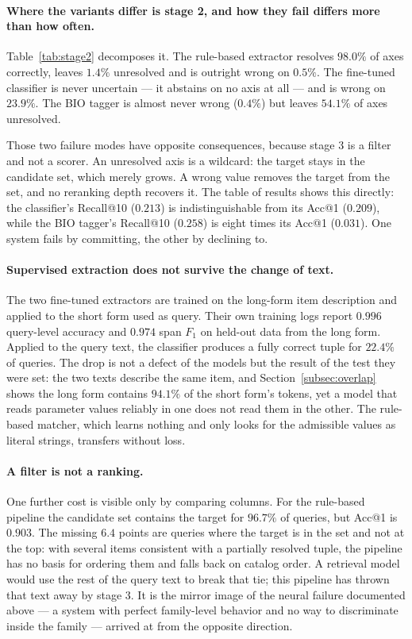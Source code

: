 \documentclass[preprint,review,12pt]{elsarticle}
\begin{document}
\paragraph{Where the variants differ is stage 2, and how they fail differs more than how often.}
Table~\ref{tab:stage2} decomposes it. The rule-based extractor resolves $98.0\%$ of axes correctly, leaves $1.4\%$ unresolved and is outright wrong on $0.5\%$. The fine-tuned classifier is never uncertain --- it abstains on no axis at all --- and is wrong on $23.9\%$. The BIO tagger is almost never wrong ($0.4\%$) but leaves $54.1\%$ of axes unresolved.



Those two failure modes have opposite consequences, because stage 3 is a filter and not a scorer. An unresolved axis is a wildcard: the target stays in the candidate set, which merely grows. A wrong value removes the target from the set, and no reranking depth recovers it. The table of results shows this directly: the classifier's Recall@10 ($0.213$) is indistinguishable from its Acc@1 ($0.209$), while the BIO tagger's Recall@10 ($0.258$) is eight times its Acc@1 ($0.031$). One system fails by committing, the other by declining to.

\paragraph{Supervised extraction does not survive the change of text.}
The two fine-tuned extractors are trained on the long-form item description and applied to the short form used as query. Their own training logs report $0.996$ query-level accuracy and $0.974$ span $F_1$ on held-out data from the long form. Applied to the query text, the classifier produces a fully correct tuple for $22.4\%$ of queries. The drop is not a defect of the models but the result of the test they were set: the two texts describe the same item, and Section~\ref{subsec:overlap} shows the long form contains $94.1\%$ of the short form's tokens, yet a model that reads parameter values reliably in one does not read them in the other. The rule-based matcher, which learns nothing and only looks for the admissible values as literal strings, transfers without loss.

\paragraph{A filter is not a ranking.}
One further cost is visible only by comparing columns. For the rule-based pipeline the candidate set contains the target for $96.7\%$ of queries, but Acc@1 is $0.903$. The missing $6.4$ points are queries where the target is in the set and not at the top: with several items consistent with a partially resolved tuple, the pipeline has no basis for ordering them and falls back on catalog order. A retrieval model would use the rest of the query text to break that tie; this pipeline has thrown that text away by stage 3. It is the mirror image of the neural failure documented above --- a system with perfect family-level behavior and no way to discriminate inside the family --- arrived at from the opposite direction.
\end{document}
